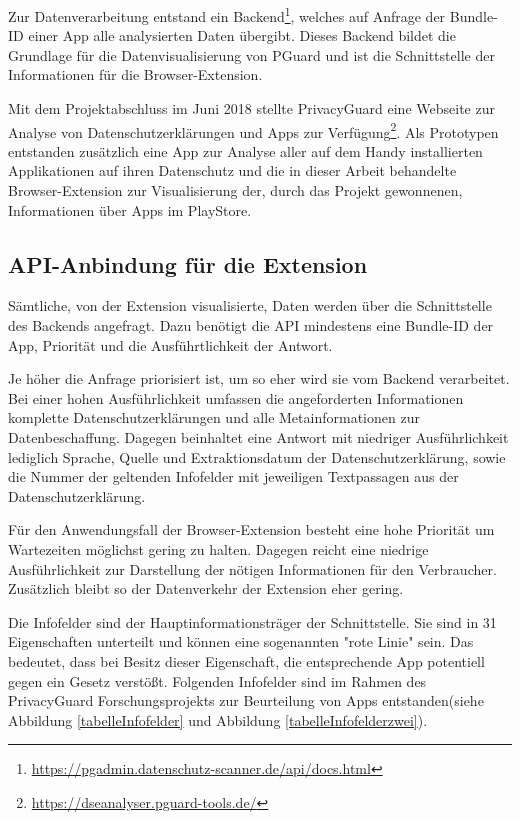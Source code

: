 Zur Datenverarbeitung entstand ein Backend\footnote{\url{https://pgadmin.datenschutz-scanner.de/api/docs.html}}, welches auf Anfrage der Bundle-ID einer App alle analysierten Daten übergibt. Dieses Backend bildet die Grundlage für die Datenvisualisierung von PGuard und ist die Schnittstelle der Informationen für die Browser-Extension.

Mit dem Projektabschluss im Juni 2018 stellte PrivacyGuard eine Webseite zur Analyse von Datenschutzerklärungen und Apps zur Verfügung\footnote{\url{https://dseanalyser.pguard-tools.de/}}. Als Prototypen entstanden zusätzlich eine App zur Analyse aller auf dem Handy installierten Applikationen auf ihren Datenschutz und die in dieser Arbeit behandelte Browser-Extension zur Visualisierung der, durch das Projekt gewonnenen, Informationen über Apps im PlayStore.

\subsection{API-Anbindung für die Extension}
\label{ss:apianbindung}

Sämtliche, von der Extension visualisierte, Daten werden über die Schnittstelle des Backends angefragt. Dazu benötigt die API mindestens eine Bundle-ID der App, Priorität und die Ausführtlichkeit der Antwort.

Je höher die Anfrage priorisiert ist, um so eher wird sie vom Backend verarbeitet. 
Bei einer hohen Ausführlichkeit umfassen die angeforderten Informationen komplette Datenschutzerklärungen und alle Metainformationen zur Datenbeschaffung. Dagegen beinhaltet eine Antwort mit niedriger Ausführlichkeit lediglich Sprache, Quelle und Extraktionsdatum der Datenschutzerklärung, sowie die Nummer der geltenden Infofelder mit jeweiligen Textpassagen aus der Datenschutzerklärung.

Für den Anwendungsfall der Browser-Extension besteht eine hohe Priorität um Wartezeiten möglichst gering zu halten. Dagegen reicht eine niedrige Ausführlichkeit zur Darstellung der nötigen Informationen für den Verbraucher. Zusätzlich bleibt so der Datenverkehr der Extension eher gering.

Die Infofelder sind der Hauptinformationsträger der Schnittstelle. Sie sind in 31 Eigenschaften unterteilt und können eine sogenannten "rote Linie" sein. Das bedeutet, dass bei Besitz dieser Eigenschaft, die entsprechende App potentiell gegen ein Gesetz verstößt. Folgenden Infofelder sind im Rahmen des PrivacyGuard Forschungsprojekts zur Beurteilung von Apps entstanden(siehe Abbildung \ref{tabelleInfofelder} und Abbildung \ref{tabelleInfofelderzwei}).

